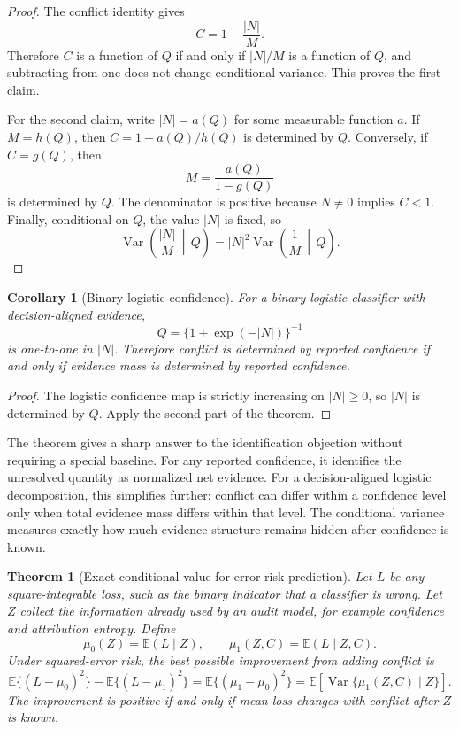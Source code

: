 \documentclass[11pt]{article}
\newtheorem{theorem}{Theorem}
\newtheorem{corollary}{Corollary}
\newcommand{\E}{\mathbb{E}}
\begin{document}
\begin{proof}
The conflict identity gives
\[
C=1-\frac{|N|}{M}.
\]
Therefore $C$ is a function of $Q$ if and only if $|N|/M$ is a function of
$Q$, and subtracting from one does not change conditional variance. This proves
the first claim.

For the second claim, write $|N|=a(Q)$ for some measurable function $a$. If
$M=h(Q)$, then $C=1-a(Q)/h(Q)$ is determined by $Q$. Conversely, if
$C=g(Q)$, then
\[
M=\frac{a(Q)}{1-g(Q)}
\]
is determined by $Q$. The denominator is positive because $N\neq0$ implies
$C<1$. Finally, conditional on $Q$, the value $|N|$ is fixed, so
\[
\operatorname{Var}\!\left(\frac{|N|}{M}\,\middle|\,Q\right)
=
|N|^2\operatorname{Var}\!\left(\frac{1}{M}\,\middle|\,Q\right).
\]
\end{proof}

\begin{corollary}[Binary logistic confidence]
For a binary logistic classifier with decision-aligned evidence,
\[
Q=\{1+\exp(-|N|)\}^{-1}
\]
is one-to-one in $|N|$. Therefore conflict is determined by reported
confidence if and only if evidence mass is determined by reported confidence.
\end{corollary}

\begin{proof}
The logistic confidence map is strictly increasing on $|N|\geq0$, so $|N|$ is
determined by $Q$. Apply the second part of the theorem.
\end{proof}

The theorem gives a sharp answer to the identification objection without
requiring a special baseline. For any reported confidence, it identifies the
unresolved quantity as normalized net evidence. For a decision-aligned
logistic decomposition, this simplifies further: conflict can differ within a
confidence level only when total evidence mass differs within that level. The
conditional variance measures exactly how much evidence structure remains
hidden after confidence is known.

\begin{theorem}[Exact conditional value for error-risk prediction]
Let $L$ be any square-integrable loss, such as the binary indicator that a classifier is wrong. Let $Z$ collect the information already used by an audit model, for example confidence and attribution entropy. Define
\[
\mu_0(Z)=\E(L\mid Z),
\qquad
\mu_1(Z,C)=\E(L\mid Z,C).
\]
Under squared-error risk, the best possible improvement from adding conflict is
\[
\E\{(L-\mu_0)^2\}
-
\E\{(L-\mu_1)^2\}
=
\E\{(\mu_1-\mu_0)^2\}
=
\E\!\left[\operatorname{Var}\{\mu_1(Z,C)\mid Z\}\right].
\]
The improvement is positive if and only if mean loss changes with conflict after $Z$ is known.
\end{theorem}
\end{document}
